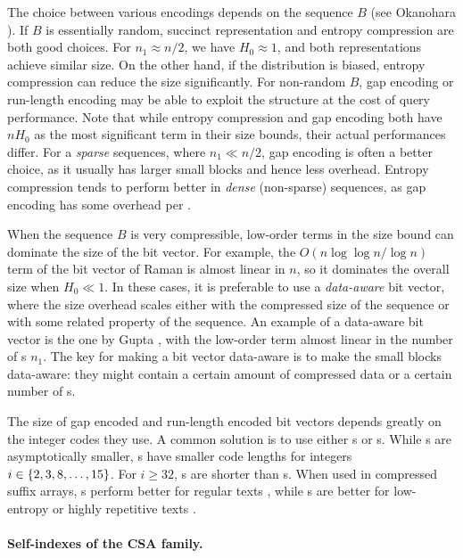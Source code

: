 The choice between various encodings depends on the sequence $B$ (see Okanohara ). If $B$ is essentially random, succinct representation and entropy compression are both good choices. For $n_{1} \approx n/2$, we have $H_{0} \approx 1$, and both representations achieve similar size. On the other hand, if the distribution is biased, entropy compression can reduce the size significantly. For non-random $B$, gap encoding or run-length encoding may be able to exploit the structure at the cost of query performance. Note that while entropy compression and gap encoding both have $nH_{0}$ as the most significant term in their size bounds, their actual performances differ. For a \emph{sparse} sequences, where $n_{1} \ll n/2$, gap encoding is often a better choice, as it usually has larger small blocks and hence less overhead. Entropy compression tends to perform better in \emph{dense} (non-sparse) sequences, as gap encoding has some overhead per \onebit{}.

When the sequence $B$ is very compressible, low-order terms in the size bound can dominate the size of the bit vector. For example, the $O(n \log \log n / \log n)$ term of the bit vector of Raman  is almost linear in $n$, so it dominates the overall size when $H_{0} \ll 1$. In these cases, it is preferable to use a \emph{data-aware} bit vector, where the size overhead scales  either with the compressed size of the sequence or with some related property of the sequence. An example of a data-aware bit vector is the one by Gupta , with the low-order term almost linear in the number of \onebit{}s $n_{1}$. The key for making a bit vector data-aware is to make the small blocks data-aware: they might contain a certain amount of compressed data or a certain number of \onebit{}s.

The size of gap encoded and run-length encoded bit vectors depends greatly on the integer codes they use. A common solution is to use either \gammacode{}s or \deltacode{}s. While \deltacode{}s are asymptotically smaller, \gammacode{}s have smaller code lengths for integers $i \in \{ 2, 3, 8, \dotsc, 15 \}$. For $i \ge 32$, \deltacode{}s are shorter than \gammacode{}s. When used in compressed suffix arrays, \gammacode{}s perform better for regular texts \cite{Foschini2006}, while \deltacode{}s are better for low-entropy or highly repetitive texts \cite{Grossi2011}.

\paragraph{Self-indexes of the CSA family.}

